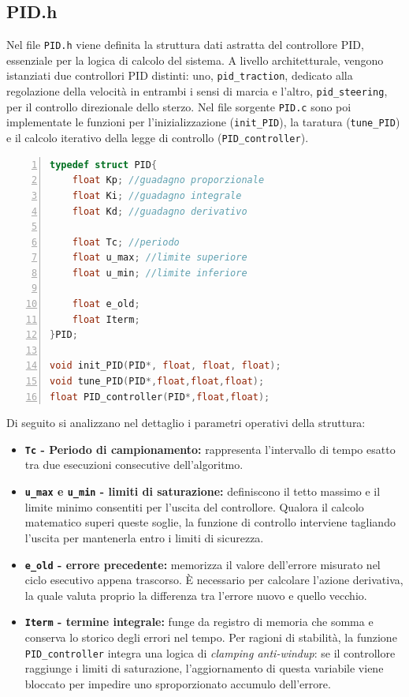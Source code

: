 \documentclass[11pt]{report}
\begin{document}
\subsection{PID.h}
Nel file \verb|PID.h| viene definita la struttura dati astratta del controllore PID, essenziale per la logica di calcolo del sistema. A livello architetturale, vengono istanziati due controllori PID distinti: uno, \verb|pid_traction|, dedicato alla regolazione della velocità in entrambi i sensi di marcia e l'altro, \verb|pid_steering|, per il controllo direzionale dello sterzo. Nel file sorgente \verb|PID.c| sono poi implementate le funzioni per l'inizializzazione (\verb|init_PID|), la taratura (\verb|tune_PID|) e il calcolo iterativo della legge di controllo (\verb|PID_controller|).
\begin{lstlisting}[language=Cpp, caption={PID.h}, numbers=left, stepnumber=1]
typedef struct PID{
	float Kp; //guadagno proporzionale
	float Ki; //guadagno integrale
	float Kd; //guadagno derivativo

	float Tc; //periodo
	float u_max; //limite superiore
	float u_min; //limite inferiore

	float e_old;
	float Iterm;
}PID;

void init_PID(PID*, float, float, float);
void tune_PID(PID*,float,float,float);
float PID_controller(PID*,float,float);
\end{lstlisting}

Di seguito si analizzano nel dettaglio i parametri operativi della struttura:

\begin{itemize}
    \item \textbf{\texttt{Tc} - Periodo di campionamento:} rappresenta l'intervallo di tempo esatto tra due esecuzioni consecutive dell'algoritmo.
    \item \textbf{\texttt{u\_max} e \texttt{u\_min} - limiti di saturazione:} definiscono il tetto massimo e il limite minimo consentiti per l'uscita del controllore. Qualora il calcolo matematico superi queste soglie, la funzione di controllo interviene tagliando l'uscita per mantenerla entro i limiti di sicurezza.
    \item \textbf{\texttt{e\_old} - errore precedente:} memorizza il valore dell'errore misurato nel ciclo esecutivo appena trascorso. È necessario per calcolare l'azione derivativa, la quale valuta proprio la differenza tra l'errore nuovo e quello vecchio.
    \item \textbf{\texttt{Iterm} - termine integrale:} funge da registro di memoria che somma e conserva lo storico degli errori nel tempo. Per ragioni di stabilità, la funzione \verb|PID_controller| integra una logica di \textit{clamping anti-windup}: se il controllore raggiunge i limiti di saturazione, l'aggiornamento di questa variabile viene bloccato per impedire uno sproporzionato accumulo dell'errore.
\end{itemize}
\end{document}
